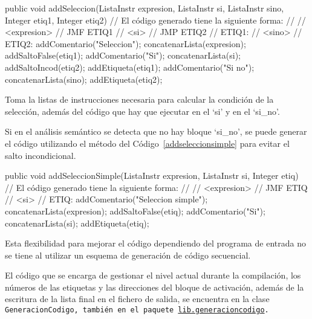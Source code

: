 \begin{codigo}[style=java, caption={Método \url{lib.generacioncodigo.ListaInstr.addSeleccion}}, label={addseleccion}]
public void addSeleccion(ListaInstr expresion, ListaInstr si, ListaInstr sino, Integer etiq1, Integer etiq2) {
    // El código generado tiene la siguiente forma:
    //
    //			<expresion>
    //			JMF ETIQ1
    //			<si>
    //			JMP ETIQ2
    // ETIQ1:
    //			<sino>
    // ETIQ2:
    addComentario("Seleccion");
    concatenarLista(expresion);
    addSaltoFalse(etiq1);
    addComentario("Si");
    concatenarLista(si);
    addSaltoIncod(etiq2);
    addEtiqueta(etiq1);
    addComentario("Si no");
    concatenarLista(sino);
    addEtiqueta(etiq2);
}
\end{codigo}

Toma la listas de instrucciones necesaria para calcular la condición de la selección, además del código que hay que ejecutar en el `si' y en el `si\_no'.

Si en el análisis semántico se detecta que no hay bloque `si\_no', se puede generar el código utilizando el método del Código~\ref{addseleccionsimple} para evitar el salto incondicional.

\begin{codigo}[style=java, caption={Método \url{lib.generacioncodigo.ListaInstr.addSeleccionSimple}}, label={addseleccionsimple}]
public void addSeleccionSimple(ListaInstr expresion, ListaInstr si, Integer etiq) {
    // El código generado tiene la siguiente forma:
    //
    //			<expresion>
    //			JMF ETIQ
    //			<si>
    // ETIQ:
    addComentario("Seleccion simple");
    concatenarLista(expresion);
    addSaltoFalse(etiq);
    addComentario("Si");
    concatenarLista(si);
    addEtiqueta(etiq);
}
\end{codigo}

Esta flexibilidad para mejorar el código dependiendo del programa de entrada no se tiene al utilizar un esquema de generación de código secuencial.

El código que se encarga de gestionar el nivel actual durante la compilación, los números de las etiquetas y las direcciones del bloque de activación, además de la escritura de la lista final en el fichero de salida, se encuentra en la clase \tt{GeneracionCodigo}, también en el paquete \url{lib.generacioncodigo}.
